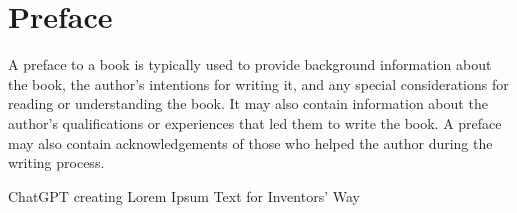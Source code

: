 \chapter*{Preface}

A preface to a book is typically used to provide background information about the book, the author's intentions for writing it, and any special considerations for reading or understanding the book. It may also contain information about the author's qualifications or experiences that led them to write the book. A preface may also contain acknowledgements of those who helped the author during the writing process.

ChatGPT creating Lorem Ipsum Text for Inventors' Way